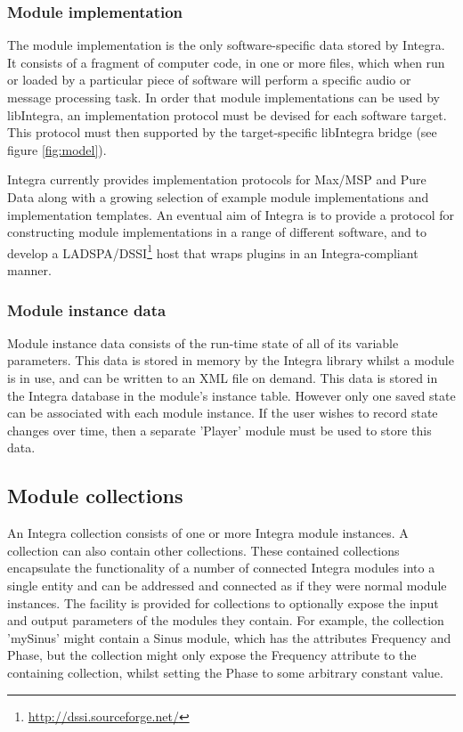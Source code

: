 {\subsubsection{Module implementation}\label{subsubsec:module_implementation}

The module implementation is the only software-specific data stored by Integra. It consists of a fragment of computer code, in one or more files, which when run or loaded by a particular piece of software will perform a specific audio or message processing task. In order that module implementations can be used by libIntegra, an implementation protocol must be devised for each software target. This protocol must then supported by the target-specific libIntegra bridge (see figure \ref{fig:model}).

Integra currently provides implementation protocols for Max/MSP and Pure Data along with a growing selection of example module implementations and implementation templates. An eventual aim of Integra is to provide a protocol for constructing module implementations in a range of different software, and to develop a LADSPA/DSSI\footnote{\url{http://dssi.sourceforge.net/}} host that wraps plugins in an Integra-compliant manner.

\subsubsection{Module instance data}\label{subsubsec:module_instance_data} 

Module instance data consists of the run-time state of all of its variable parameters. This data is stored in memory by the Integra library whilst a module is in use, and can be written to an XML file on demand. This data is stored in the Integra database in the module's instance table. However only one saved state can be associated with each module instance. If the user wishes to record state changes over time, then a separate 'Player' module must be used to store this data.

\subsection{Module collections}\label{subsec:module_collections}

An Integra collection consists of one or more Integra module instances. A collection can also contain other collections. These contained collections encapsulate the functionality of a number of connected Integra modules into a single entity and can be addressed and connected as if they were normal module instances. The facility is provided for collections to optionally expose the input and output parameters of the modules they contain. For example, the collection 'mySinus' might contain a Sinus module, which has the attributes Frequency and Phase, but the collection might only expose the Frequency attribute to the containing collection, whilst setting the Phase to some arbitrary constant value.

}
